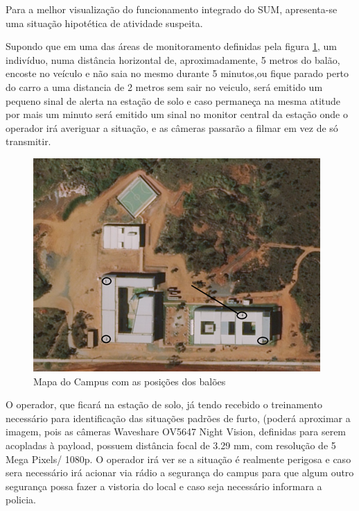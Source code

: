 Para a melhor visualização do funcionamento integrado do SUM, apresenta-se uma situação hipotética de atividade suspeita.

Supondo que em uma das áreas de monitoramento definidas pela figura \ref{img: Mapa do Campus com as posições dos balões}, um indivíduo, numa distância horizontal de, aproximadamente, 5 metros do balão, encoste no veículo e não saia no mesmo durante 5 minutos,ou fique parado perto do carro a uma distancia de 2 metros sem sair no veiculo, será emitido um pequeno sinal de alerta na estação de solo e caso permaneça na mesma atitude por mais um minuto será emitido um sinal no monitor central da estação onde o operador irá averiguar a situação, e as câmeras passarão a filmar em vez de só transmitir.
\begin{figure}[htp]
\centering
\includegraphics[scale=0.80]{figuras/campus}
\caption{Mapa do Campus com as posições dos balões}
\label{img: Mapa do Campus com as posições dos balões}
\end{figure}

O operador, que ficará na estação de solo, já tendo recebido o treinamento necessário para identificação das situações padrões de furto, (poderá aproximar a imagem, pois as câmeras Waveshare OV5647 Night Vision, definidas para serem acopladas à payload, possuem distância focal de 3.29 mm, com resolução de 5 Mega Pixels/ 1080p. O operador irá ver se a situação é realmente perigosa e caso sera necessário irá acionar  via rádio a segurança do campus para que algum outro segurança possa fazer a vistoria do local e caso seja necessário informara a policia.

